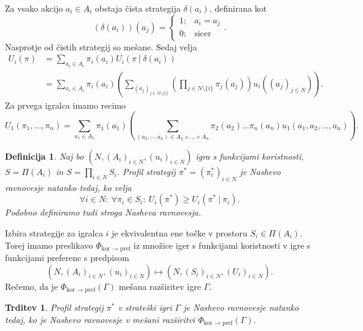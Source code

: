 \documentclass[10pt, a4paper]{article}
\newtheorem{trditev}[izr]{Trditev}
\newtheorem{defi}[izr]{Definicija}
\newenvironment{noticeB}{%
  \tcolorbox[%
  notitle,
  empty,
  enhanced,  %
  breakable,
  coltext=black,
  colback=white, 
  fontupper=\rmfamily,
  parbox=false,
  noparskip,
  sharp corners,
  boxrule=-1pt,  %
  frame hidden,
  left=7pt,  %
  right=7pt,
  top=5pt,
  bottom=5pt,
  before skip=2.5ex plus 2pt,
  after skip=2.5ex plus 2pt,
  borderline west = {1.5pt}{-0.1pt}{blue!30!black}, %
  overlay unbroken and last={%
    \draw[color=black, line width=1.25pt]
    ($(frame.south west)+(1.pt, -0.1pt)$) -- ++(2em, 0);
  }
  ]}
{\endtcolorbox}
\newenvironment{definicija}{\begin{defi}\begin{noticeB}}{%
    \end{noticeB}\end{defi}}
\begin{document}
Za vsako akcijo $a_i \in A_i$ obstaja čista strategija $\delta(a_i)$, definirana kot 
$$\left(\delta(a_i)\right) (a_j) = \begin{cases}
  1; & a_i = a_j\\
  0; & \textrm{sicer}
\end{cases}.$$
Nasprotje od čistih strategij so mešane. Sedaj velja 
\begin{align*}
  U_i (\pi) &= \sum_{a_i \in A_i} \pi_i (a_i) U_i(\pi\ \big|\ \delta (a_i))\\
  &= \sum_{a_i \in A_i} \pi_i (a_i) \left(\sum_{(a_j)_{j \in N\setminus \{i\}}} \left(\prod_{j \in N \setminus \{i\}} \pi_j (a_j)\right) u_i((a_j)_{j \in N})\right).
\end{align*}
Za prvega igralca imamo recimo
$$U_1 (\pi_1, \dots, \pi_n) = \sum_{a_1 \in A_1} \pi_1 (a_1) \left(\sum_{(a_2, \cdots, a_n) \in A_2 \times \dots \times A_n} \pi_2 (a_2) \dots \pi_n (a_n) u_1 (a_1, a_2, \dots, a_n)\right).$$
\begin{definicija}
  Naj bo $(N, (A_i)_{i \in N}, (u_i)_{i \in N})$ igra s funkcijami koristnosti, 
  $S = \Pi (A_i)$ in $S = \prod_{i \in N} S_i$.
  Profil strategij $\pi^* = (\pi^* _i)_{i \in N}$ je Nashevo ravnovesje natanko tedaj,
  ko velja 
  $$\forall i \in N:\ \forall \pi_i \in S_i:\ U_i (\pi^*) \geq U_i (\pi^*\ |\ \pi_i).$$
  Podobno definiramo tudi stroga Nasheva ravnovesja.
\end{definicija}

Izbira strategije za igralca $i$ je ekvivalentna ene točke v prostoru $S_i \in \Pi(A_i)$.
Torej imamo preslikavo $\Phi_{\text{kor $\to$ pref}}$ iz množice iger s funkcijami koristnosti v igre s funkcijami preferenc s predpisom 
$$(N, (A_i)_{i \in N}, (u_i)_{i \in N}) \mapsto (N, (S_i)_{i \in N}, (U_i)_{i \in N}).$$
Rečemo, da je $\Phi_{\text{kor $\to$ pref}} (\Gamma)$ mešana razširitev igre $\Gamma$.

\begin{trditev}
  Profil strategij $\pi^*$ v strateški igri $\Gamma$ je Nashevo ravnovesje natanko tedaj,
  ko je Nashevo ravnovesje v mešani razširitvi $\Phi_{\text{kor $\to$ pref}} (\Gamma)$.
\end{trditev}
\end{document}
